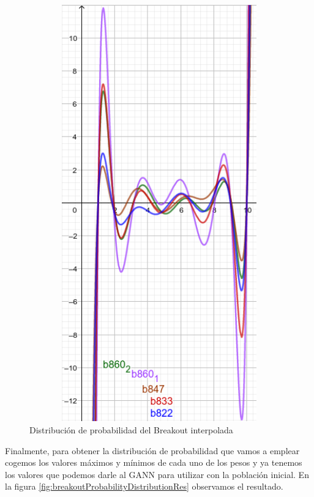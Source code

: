 \begin{figure}[H]
    \centering
    
    \includegraphics[width=1\textwidth,height=18cm]{Figures/breakoutProbabilityDistributionInterpolated}
    
    \caption{Distribución de probabilidad del Breakout interpolada}
    \label{fig:breakoutProbabilityDistributionInterpolated}
\end{figure}

Finalmente, para obtener la distribución de probabilidad que vamos a emplear cogemos los valores máximos y mínimos de cada uno de los pesos y ya tenemos los valores que podemos darle al GANN para utilizar con la población inicial. En la figura \ref{fig:breakoutProbabilityDistributionRes} observamos el resultado.

